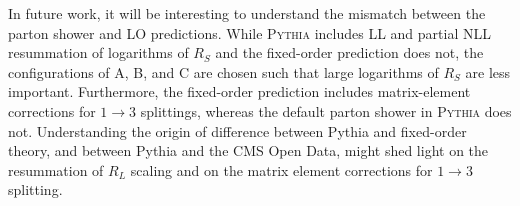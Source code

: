\documentclass[aps,prl,twocolumn,showpacs,10pt,superscriptaddress,preprintnumbers,nofootinbib,longbibliography]{revtex4-1}
\begin{document}
In future work, it will be interesting to understand the mismatch between the parton shower and LO predictions.
%
While \textsc{Pythia} includes LL and partial NLL resummation of logarithms of $R_S$ and the fixed-order prediction does not, the configurations of A, B, and C are chosen such that large logarithms of $R_S$ are less important.
%
Furthermore, the fixed-order prediction includes matrix-element corrections for $1\to 3$ splittings, whereas the default parton shower in \textsc{Pythia} does not. 
%
Understanding the origin of difference between Pythia and fixed-order theory, and between Pythia and the CMS Open Data, might shed light on the resummation of $R_L$ scaling and on the matrix element corrections for $1 \to 3$ splitting.
\end{document}
